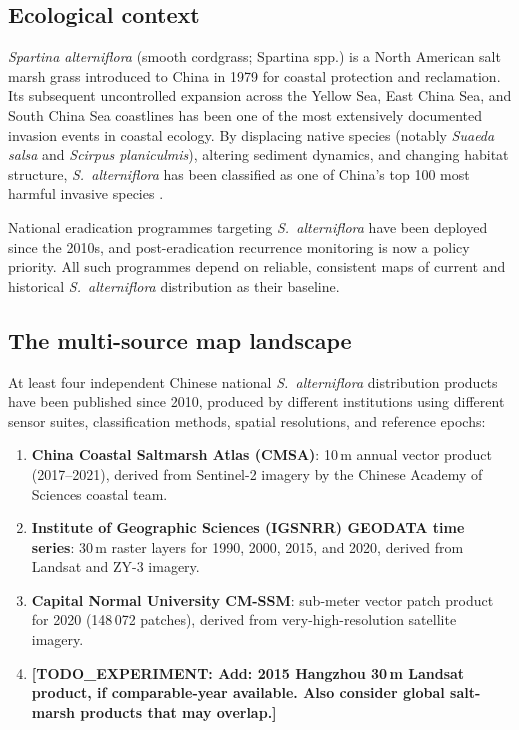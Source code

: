 \documentclass[11pt]{article}
\newcommand{\TODOEXP}[1]{\textcolor{todocolor}{\textbf{[TODO_EXPERIMENT: #1]}}}
\begin{document}
\subsection{Ecological context}

\textit{Spartina alterniflora} (smooth cordgrass; Spartina spp.) is a North American
salt marsh grass introduced to China in 1979 for coastal protection and
reclamation\citep{an_1985_spartina}.
Its subsequent uncontrolled expansion across the Yellow Sea, East China Sea,
and South China Sea coastlines has been one of the most extensively documented
invasion events in coastal ecology\citep{li_2009_spartina}. By displacing native
species (notably \textit{Suaeda salsa} and \textit{Scirpus planiculmis}),
altering sediment dynamics, and changing habitat structure, \textit{S.~alterniflora}
has been classified as one of China's top 100 most harmful invasive species
\citep{zhou_2009_invasive}.

National eradication programmes targeting \textit{S.~alterniflora} have been
deployed since the 2010s, and post-eradication recurrence monitoring is now a
policy priority\citep{cma_2021_eradication}. All such programmes depend on
reliable, consistent maps of current and historical \textit{S.~alterniflora}
distribution as their baseline.

\subsection{The multi-source map landscape}

At least four independent Chinese national \textit{S.~alterniflora} distribution
products have been published since 2010, produced by different institutions
using different sensor suites, classification methods, spatial resolutions, and
reference epochs:

\begin{enumerate}[nosep]
\item \textbf{China Coastal Saltmarsh Atlas (CMSA)}: 10\,m annual vector product
  (2017--2021), derived from Sentinel-2 imagery by the Chinese Academy of
  Sciences coastal team\citep{TODO_CMSA_CITATION}.
\item \textbf{Institute of Geographic Sciences (IGSNRR) GEODATA time series}:
  30\,m raster layers for 1990, 2000, 2015, and 2020, derived from Landsat and
  ZY-3 imagery\citep{TODO_GEODATA_CITATION}.
\item \textbf{Capital Normal University CM-SSM}: sub-meter vector patch product
  for 2020 (148\,072 patches), derived from very-high-resolution satellite
  imagery\citep{xu_2025_cmssm}.
\item \TODOEXP{Add: 2015 Hangzhou 30\,m Landsat product, if comparable-year available.
  Also consider global salt-marsh products that may overlap.}
\end{enumerate}
\end{document}
